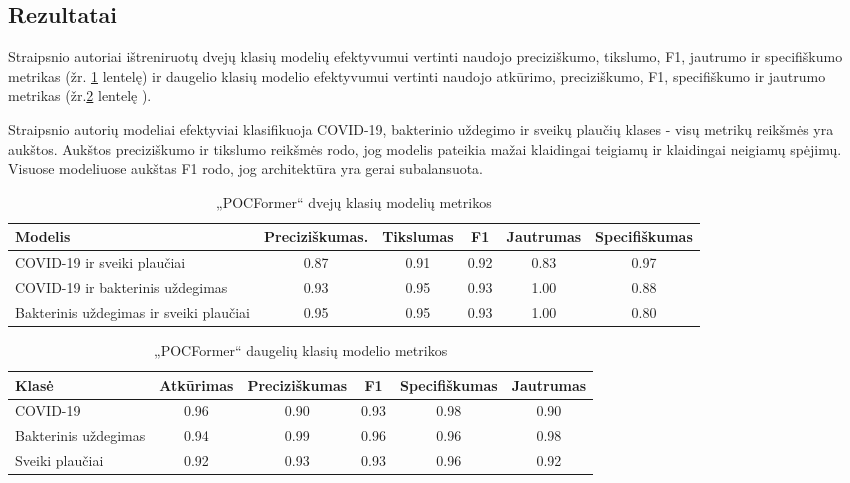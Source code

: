\documentclass[fleqn]{VUMIFKompMagistrinis}
\begin{document}
\subsection{Rezultatai}
Straipsnio autoriai ištreniruotų dvejų klasių modelių efektyvumui vertinti naudojo preciziškumo, tikslumo, F1, jautrumo ir specifiškumo  metrikas (žr. \ref{tab:statistikos1} lentelę) ir daugelio klasių modelio efektyvumui vertinti naudojo atkūrimo, preciziškumo, F1, specifiškumo ir jautrumo metrikas (žr.\ref{tab:statistikos2} lentelę ). 
\par
Straipsnio autorių modeliai efektyviai klasifikuoja COVID-19, bakterinio uždegimo ir sveikų plaučių klases - visų metrikų reikšmės yra aukštos. Aukštos preciziškumo ir tikslumo reikšmės rodo, jog modelis pateikia mažai klaidingai teigiamų ir klaidingai neigiamų spėjimų. Visuose modeliuose aukštas F1 rodo, jog architektūra yra gerai subalansuota.
\begin{table}[H]\footnotesize
  \centering
  \caption{„POCFormer“ dvejų klasių modelių metrikos \cite{PAY21}}
  \begin{tabular}{|l|c|c|c|c|c|} \hline
    Modelis & Preciziškumas. & Tikslumas & F1 & Jautrumas & Specifiškumas \\
    \hline
    COVID-19 ir sveiki plaučiai & 0.87 & 0.91 & 0.92 & 0.83 & 0.97 \\
    COVID-19 ir bakterinis uždegimas & 0.93 & 0.95 & 0.93 & 1.00 & 0.88 \\
    Bakterinis uždegimas ir sveiki plaučiai & 0.95 & 0.95 & 0.93 & 1.00 & 0.80 \\
    \hline
  \end{tabular}
  \label{tab:statistikos1}
\end{table}
\begin{table}[H]\footnotesize
  \centering
  \caption{„POCFormer“ daugelių klasių modelio metrikos \cite{PAY21}}
  \begin{tabular}{|l|c|c|c|c|c|} \hline
     Klasė & Atkūrimas & Preciziškumas & F1 & Specifiškumas & Jautrumas \\
    \hline
    COVID-19             & 0.96 & 0.90 & 0.93 & 0.98 & 0.90 \\
    Bakterinis uždegimas & 0.94 & 0.99 & 0.96 & 0.96 & 0.98 \\
    Sveiki plaučiai      & 0.92 & 0.93 & 0.93 & 0.96 & 0.92 \\
    \hline
  \end{tabular}
  \label{tab:statistikos2}
\end{table}
\par
\end{document}
